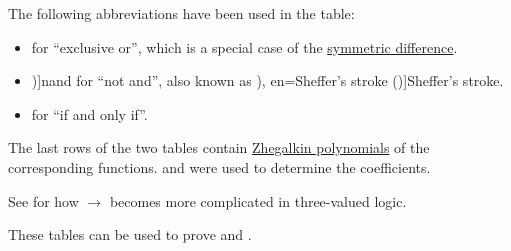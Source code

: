 \begin{definition}
  The following abbreviations have been used in the table:
  \begin{itemize}
    \item {} for \enquote{exclusive or}, which is a special case of the \hyperref[def:symmetric_difference]{symmetric difference}.
    \item \term[en=nand (\cite[40]{Hinman2005Logic})]{nand} for \enquote{not and}, also known as \term[ru=штрих Шеффера (\cite[29]{Эдельман1975Логика}), en=Sheffer's stroke (\cite[40]{Hinman2005Logic})]{Sheffer's stroke}.
    \item {} for \enquote{if and only if}.
  \end{itemize}
\end{definition}
\begin{comments}
  \item The last rows of the two tables contain \hyperref[def:zhegalkin_polynomial]{Zhegalkin polynomials} of the corresponding functions.  and  were used to determine the coefficients.

  \item See  for how \( {\rightarrow} \) becomes more complicated in three-valued logic.

  \item These tables can be used to prove  and .
\end{comments}

